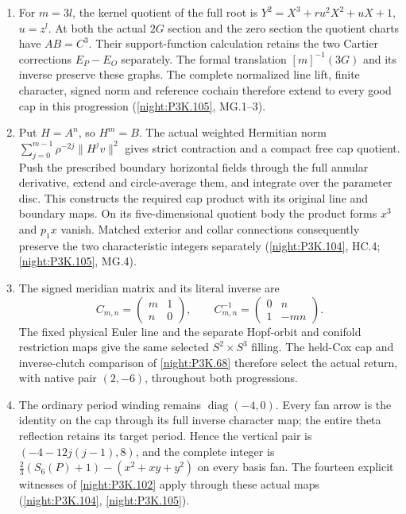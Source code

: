 \begin{enumerate}[label=\arabic*.]
  $(-4,8)$ before the explicitly tracked dual-line and boundary
  orientation arrows, which give the same physical pair
  (\cref{night:P3K.105}, MB.1--7 and its odd-ideal companion).
\item For $m=3l$, the kernel quotient of the full root is
  $Y^2=X^3+ru^2X^2+uX+1$, $u=z^l$.
  At both the actual $2G$ section and the zero section the quotient
  charts have $AB=C^3$. Their support-function calculation retains
  the two Cartier corrections $E_P-E_O$ separately.
  The formal translation $[m]^{-1}(3G)$ and its inverse preserve
  these graphs. The complete normalized line lift, finite
  character, signed norm and reference cochain therefore extend
  to every good cap in this progression
  (\cref{night:P3K.105}, MG.1--3).
\item Put $H=A^n$, so $H^m=B$. The actual weighted Hermitian
  norm $\sum_{j=0}^{m-1}\rho^{-2j}\|H^jv\|^2$ gives strict
  contraction and a compact free cap quotient. Push the prescribed
  boundary horizontal fields through the full annular derivative,
  extend and circle-average them, and integrate over the parameter
  disc. This constructs the required cap product with its original
  line and boundary maps. On its five-dimensional quotient body
  the product forms $x^3$ and $p_1x$ vanish. Matched exterior and
  collar connections consequently preserve the two characteristic
  integers separately
  (\cref{night:P3K.104}, HC.4; \cref{night:P3K.105}, MG.4).
\item The signed meridian matrix and its literal inverse are
  \[
  C_{m,n}=\begin{pmatrix}m&1\\n&0\end{pmatrix},\qquad
  C_{m,n}^{-1}=\begin{pmatrix}0&n\\1&-mn\end{pmatrix}.
  \]
  The fixed physical Euler line and the separate Hopf-orbit and
  conifold restriction maps give the same selected
  $S^2\times S^3$ filling. The held-Cox cap and inverse-clutch
  comparison of \cref{night:P3K.68} therefore select the actual
  return, with native pair $(2,-6)$, throughout both progressions.
\item The ordinary period winding remains
  $\operatorname{diag}(-4,0)$. Every fan arrow is the identity on
  the cap through its full inverse character map; the entire theta
  reflection retains its target period. Hence the vertical pair is
  $(-4-12j(j-1),8)$, and the complete integer is
  $\tfrac23(S_6(P)+1)-(x^2+xy+y^2)$ on every basis fan.
  The fourteen explicit witnesses of \cref{night:P3K.102}
  apply through these actual maps
  (\cref{night:P3K.104}, \cref{night:P3K.105}).
\end{enumerate}

